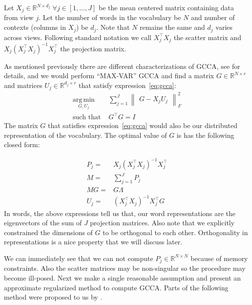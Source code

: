 \documentclass[11pt]{article}
\begin{document}
Let $X_j \in \mathbb{R}^{N\times d_j} \; \forall j \in [1,\ldots,J]$
be the mean centered matrix containing data from view 
$j$. Let the number of words in the vocabulary be $N$ and number of
contexts (columns in $X_j$) be $d_j$. Note that $N$ remains the same 
and $d_j$ varies across views. Following standard notation
\cite{hastie2009elements} we call $X_j^\top X_j$
the scatter matrix  and $X_j (X_j^\top X_j)^{-1}X_j^\top$ the
projection matrix.

As mentioned previously there are different characterizations of GCCA, see
\cite{kettenring1971canonical} for details, and we would perform
``MAX-VAR'' GCCA and find
 a matrix $G \in \mathbb{R}^{N\times r}$ and matrices  $U_j \in
 \mathbb{R}^{d_j \times r}$ that satisfy expression~\ref{eq:gcca}:
\begin{equation}
  \label{eq:gcca}
\begin{split}
  \operatorname*{\arg\,\min}_{G,U_j} & \sum_{j=1}^J \begin{Vmatrix} G - X_jU_j \end{Vmatrix}^2_F \\
  \text{such that } & G^\top G = I
\end{split}
\end{equation}
The matrix $G$ that satisfies expression~\ref{eq:gcca} would also be our
distributed representation of the vocabulary.
The optimal value of $G$ is has the following closed form:

\begin{align}
P_j =& X_j(X_j^\top X_j)^{-1}X_j^\top \label{eq:pp}\\
M =& \sum_{j=1}^J P_j \label{eq:mm}\\
M G =& G \Lambda\\
U_j =& \left(X_j^\top X_j\right)^{-1} X_j^\top G
\end{align}
In words, the above
expressions tell us that, our word representations are the
eigenvectors of the sum of $J$ projection matrices. Also note that we
explicitly constrained the dimensions of $G$ to be orthogonal to each other. Orthogonality in
representations is a nice property that we will discuss later.

We can immediately see that we can not compute
 $P_j \in \mathbb{R}^{N \times N}$ because of memory constraints.
Also the
scatter matrices may be non-singular so the procedure may become
ill-posed. Next we make a single reasonable assumption and present an
approximate regularized method 
to compute GCCA. Parts of the
following method were proposed to us by \cite{savostyanov}.
\end{document}
